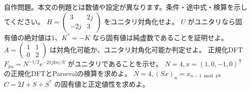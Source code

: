 \documentclass[11pt]{article}
\begin{document}
自作問題。本文の例題とは数値や設定が異なります。条件・途中式・検算を示してください。
\problem[Hermite対角化]
$H=\begin{pmatrix}3&2j\\-2j&3\end{pmatrix}$ をユニタリ対角化せよ。
\workspace{45mm}
\problem[ユニタリの固有値]
$U$ がユニタリなら固有値の絶対値は1、$K^*=-K$ なら固有値は純虚数であることを証明せよ。
\workspace{45mm}
\newpage
\problem[正規性]
$A=\begin{pmatrix}1&1\\0&2\end{pmatrix}$ は対角化可能か、ユニタリ対角化可能か判定せよ。
\workspace{45mm}
\problem[DFTの直交性]
正規化DFT $F_{kn}=N^{-1/2}e^{-2\pi jkn/N}$ がユニタリであることを示せ。
\workspace{45mm}
\newpage
\problem[4点DFT]
$N=4,x=(1,0,-1,0)^{\mathsf T}$ の正規化DFTとParsevalの検算を求めよ。
\workspace{45mm}
\problem[巡回行列]
$N=4,(Sx)_n=x_{n-1\bmod4}$。$C=2I+S+S^*$ の固有値と正定値性を求めよ。
\workspace{45mm}
\end{document}
